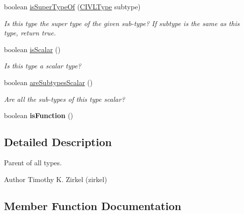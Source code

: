 \begin{DoxyCompactItemize}
\item 
boolean \hyperlink{interfaceedu_1_1udel_1_1cis_1_1vsl_1_1civl_1_1model_1_1IF_1_1type_1_1CIVLType_a7ad73051e2737015b6933ce30b78305d}{is\+Super\+Type\+Of} (\hyperlink{interfaceedu_1_1udel_1_1cis_1_1vsl_1_1civl_1_1model_1_1IF_1_1type_1_1CIVLType}{C\+I\+V\+L\+Type} subtype)
\begin{DoxyCompactList}\small\item\em Is this type the super type of the given sub-\/type? If subtype is the same as this type, return true. \end{DoxyCompactList}\item 
boolean \hyperlink{interfaceedu_1_1udel_1_1cis_1_1vsl_1_1civl_1_1model_1_1IF_1_1type_1_1CIVLType_a09569c9ab288a65c928c4bb3b2c099e0}{is\+Scalar} ()
\begin{DoxyCompactList}\small\item\em Is this type a scalar type? \end{DoxyCompactList}\item 
boolean \hyperlink{interfaceedu_1_1udel_1_1cis_1_1vsl_1_1civl_1_1model_1_1IF_1_1type_1_1CIVLType_a9ab881722a06afb89f948e48a31961e3}{are\+Subtypes\+Scalar} ()
\begin{DoxyCompactList}\small\item\em Are all the sub-\/types of this type scalar? \end{DoxyCompactList}\item 
\hypertarget{interfaceedu_1_1udel_1_1cis_1_1vsl_1_1civl_1_1model_1_1IF_1_1type_1_1CIVLType_a17a54f7335fce006746ebf1660a18189}{}boolean {\bfseries is\+Function} ()\label{interfaceedu_1_1udel_1_1cis_1_1vsl_1_1civl_1_1model_1_1IF_1_1type_1_1CIVLType_a17a54f7335fce006746ebf1660a18189}

\end{DoxyCompactItemize}


\subsection{Detailed Description}
Parent of all types. 

\begin{DoxyAuthor}{Author}
Timothy K. Zirkel (zirkel) 
\end{DoxyAuthor}


\subsection{Member Function Documentation}
\hypertarget{interfaceedu_1_1udel_1_1cis_1_1vsl_1_1civl_1_1model_1_1IF_1_1type_1_1CIVLType_a9ab881722a06afb89f948e48a31961e3}{}
